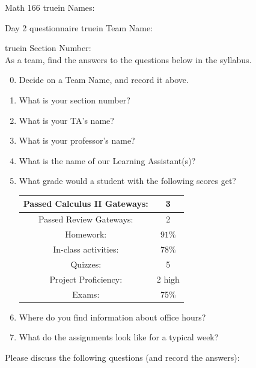 \documentclass[12pt]{article}
\begin{document}
\pagestyle{empty} %

\noindent
{Math 166   truein  Names:\ \hrulefill}

\noindent
{Day 2 questionnaire  truein  Team Name:\ \hrulefill}

\noindent  {} truein  Section Number:\ \hrulefill
\ \\

\noindent As a team, find the answers to the questions below in the syllabus.

\begin{enumerate}
\setcounter{enumi}{-1}

\item Decide on a Team Name, and record it above.
\vfill
\item What is your section number?
\vfill

\item What is your TA's name?
\vfill

\item What is your professor's name?
\vfill

\item What is the name of our Learning Assistant(s)?
\vfill

\item What grade would a student with the following scores get?

\begin{tabular}{|c|c|}
	\hline
	Passed Calculus II Gateways:& 3    \\	\hline
	Passed Review Gateways:& 2  	 \\ \hline
	Homework: & $91\%$\\	\hline
	In-class activities: & $78\%$  \\	\hline
	Quizzes:& 5   \\	\hline
	Project Proficiency:&  2 high \\	\hline
	Exams:&  75\% \\	\hline
\end{tabular}
\vfill

\item Where do you find information about office hours?
\vfill

\item What do the assignments look like for a typical week?
\vfill
\vfill


\newpage
\end{enumerate}
Please discuss the following questions (and record the answers):
\end{document}
